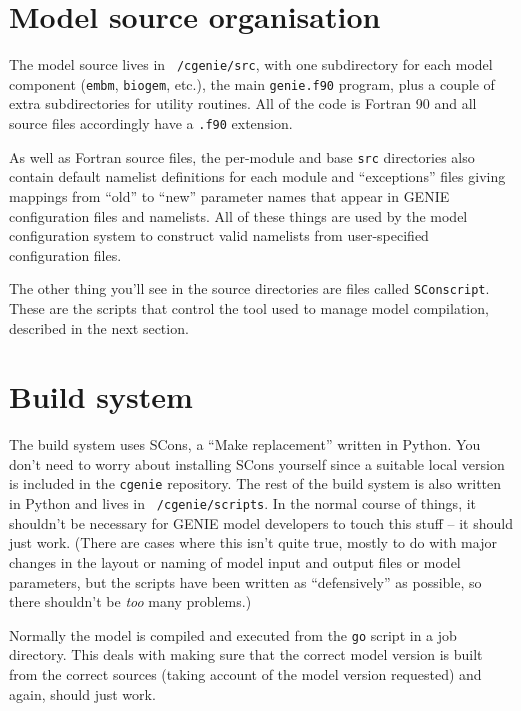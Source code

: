 \documentclass[a4paper,10pt,article]{memoir}
\begin{document}
\section{Model source organisation}

The model source lives in \texttt{~/cgenie/src}, with one subdirectory
for each model component (\texttt{embm}, \texttt{biogem}, etc.), the
main \texttt{genie.f90} program, plus a couple of extra subdirectories
for utility routines.  All of the code is Fortran 90 and all source
files accordingly have a \texttt{.f90} extension.

As well as Fortran source files, the per-module and base \texttt{src}
directories also contain default namelist definitions for each module
and ``exceptions'' files giving mappings from ``old'' to ``new''
parameter names that appear in GENIE configuration files and
namelists.  All of these things are used by the model configuration
system to construct valid namelists from user-specified configuration
files.

The other thing you'll see in the source directories are files called
\texttt{SConscript}.  These are the scripts that control the tool used
to manage model compilation, described in the next section.

\section{Build system}
\label{sec:build-system}

The build system uses SCons, a ``Make replacement'' written in
Python.  You don't need to worry about installing SCons yourself since
a suitable local version is included in the \texttt{cgenie}
repository.  The rest of the build system is also written in Python
and lives in \texttt{~/cgenie/scripts}.  In the normal course of
things, it shouldn't be necessary for GENIE model developers to touch
this stuff -- it should just work.  (There are cases where this isn't
quite true, mostly to do with major changes in the layout or naming of
model input and output files or model parameters, but the scripts have
been written as ``defensively'' as possible, so there shouldn't be
\emph{too} many problems.)

Normally the model is compiled and executed from the \texttt{go}
script in a job directory.  This deals with making sure that the
correct model version is built from the correct sources (taking
account of the model version requested) and again, should just work.
\end{document}

